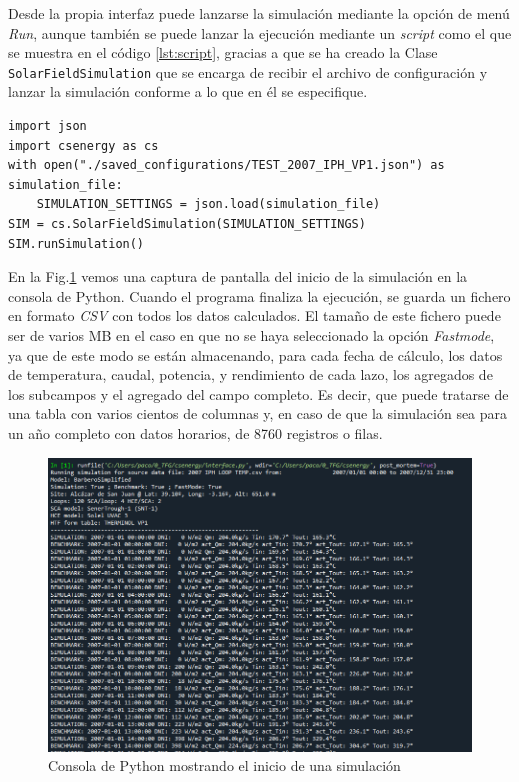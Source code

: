 Desde la propia interfaz puede lanzarse la simulación mediante la opción de menú \emph{Run}, aunque también se puede lanzar la ejecución mediante un \emph{script} como el que se muestra en el código \ref{lst:script}, gracias a que se ha creado la Clase \texttt{SolarFieldSimulation} que se encarga de recibir el archivo de configuración y lanzar la simulación conforme a lo que en él se especifique.

\begin{lstlisting}[caption=Script para lanzar la simulación a partir del fichero JSON, label={lst:script}]
import json
import csenergy as cs
with open("./saved_configurations/TEST_2007_IPH_VP1.json") as simulation_file:
    SIMULATION_SETTINGS = json.load(simulation_file)
SIM = cs.SolarFieldSimulation(SIMULATION_SETTINGS)
SIM.runSimulation()
\end{lstlisting}

En la Fig.\ref{fig:ejecucion} vemos una captura de pantalla del inicio de la simulación en la consola de Python. Cuando el programa finaliza la ejecución, se guarda un fichero en formato \emph{CSV} con todos los datos calculados. El tamaño de este fichero puede ser de varios MB en el caso en que no se haya seleccionado la opción \emph{Fastmode}, ya que  de este modo se están almacenando, para cada fecha de cálculo, los datos de temperatura, caudal, potencia, y rendimiento de cada lazo, los agregados de los subcampos y el agregado del campo completo. Es decir, que puede tratarse de una tabla con varios cientos de columnas y, en caso de que la simulación sea para un año completo con datos horarios, de 8760 registros o filas.

\begin{figure}[H]
\includegraphics[width=0.9\linewidth]{images/ejecucion.png}
\caption{Consola de Python mostrando el inicio de una simulación} 
\label{fig:ejecucion}
\end{figure}

